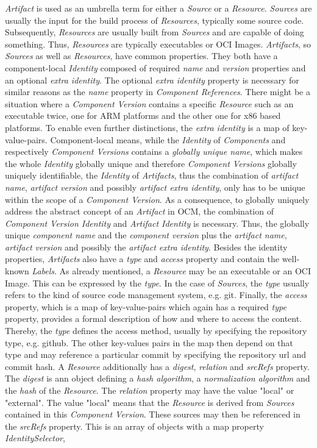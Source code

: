 \noindent \emph{Artifact} is used as an umbrella term for either a \emph{Source} or a \emph{Resource}. \emph{Sources} are usually the input for the build process of \emph{Resources}, typically some source code. Subsequently, \emph{Resources} are usually built from \emph{Sources} and are capable of doing something. Thus, \emph{Resources} are typically executables or OCI Images. \emph{Artifacts}, so \emph{Sources} as well as \emph{Resources}, have common properties. They both have a component-local \emph{Identity} composed of required \emph{name} and \emph{version} properties and an optional \emph{extra identity}. The optional \emph{extra identity} property is necessary for similar reasons as the \emph{name} property in \emph{Component References}. There might be a situation where a \emph{Component Version} contains a specific \emph{Resource} such as an executable twice, one for ARM platforms and the other one for x86 based platforms. To enable even further distinctions, the \emph{extra identity} is a map of key-value-pairs. Component-local means, while the \emph{Identity} of \emph{Components} and respectively \emph{Component Versions} contains a \emph{globally unique name}, which makes the whole \emph{Identity} globally unique and therefore \emph{Component Versions} globally uniquely identifiable, the \emph{Identity} of \emph{Artifacts}, thus the combination of \emph{artifact name}, \emph{artifact version} and possibly \emph{artifact extra identity}, only has to be unique within the scope of a \emph{Component Version}. As a consequence, to globally uniquely address the abstract concept of an \emph{Artifact} in OCM, the combination of \emph{Component Version Identity} and \emph{Artifact Identity} is necessary. Thus, the globally unique \emph{component name} and the \emph{component version} plus the \emph{artifact name}, \emph{artifact version} and possibly the \emph{artifact extra identity}. Besides the identity properties, \emph{Artifacts} also have a \emph{type} and \emph{access} property and contain the well-known \emph{Labels}. As already mentioned, a \emph{Resource} may be an executable or an OCI Image. This can be expressed by the \emph{type}. In the case of \emph{Sources}, the \emph{type} usually refers to the kind of source code management system, e.g. git. Finally, the \emph{access} property, which is a map of key-value-pairs which again has a required \emph{type} property, provides a formal description of how and where to access the content. Thereby, the \emph{type} defines the access method, usually by specifying the repository type, e.g. github. The other key-values pairs in the map then depend on that type and may reference a particular commit by specifying the repository url and commit hash. A \emph{Resource} additionally has a \emph{digest}, \emph{relation} and \emph{srcRefs} property. The \emph{digest} is ann object defining a \emph{hash algorithm}, a \emph{normalization algorithm} and the \emph{hash} of the \emph{Resource}. The \emph{relation} property may have the value "local" or "external". The value "local" means that the \emph{Resource} is derived from \emph{Sources} contained in this \emph{Component Version}. These sources may then be referenced in the \emph{srcRefs} property. This is an array of objects with a map property \emph{IdentitySelector}, 